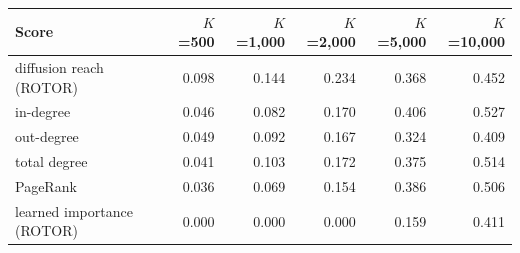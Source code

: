 \begin{tabular}{lrrrrr}
\toprule
\textbf{Score} & $K$=500 & $K$=1,000 & $K$=2,000 & $K$=5,000 & $K$=10,000 \\
\midrule
diffusion reach (ROTOR) & 0.098 & 0.144 & 0.234 & 0.368 & 0.452 \\
in-degree & 0.046 & 0.082 & 0.170 & 0.406 & 0.527 \\
out-degree & 0.049 & 0.092 & 0.167 & 0.324 & 0.409 \\
total degree & 0.041 & 0.103 & 0.172 & 0.375 & 0.514 \\
PageRank & 0.036 & 0.069 & 0.154 & 0.386 & 0.506 \\
learned importance (ROTOR) & 0.000 & 0.000 & 0.000 & 0.159 & 0.411 \\
\bottomrule
\end{tabular}
